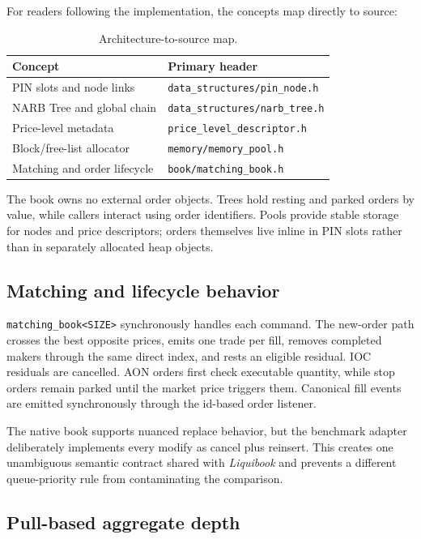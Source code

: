\documentclass[10pt,twocolumn]{article}
\begin{document}
For readers following the implementation, the concepts map directly to source:
\begin{table}[h]
\centering
\caption{Architecture-to-source map.}
\scriptsize
\begin{tabular}{@{}ll@{}}
\toprule
Concept & Primary header \\
\midrule
PIN slots and node links & \texttt{data\_structures/pin\_node.h} \\
NARB Tree and global chain & \texttt{data\_structures/narb\_tree.h} \\
Price-level metadata & \texttt{price\_level\_descriptor.h} \\
Block/free-list allocator & \texttt{memory/memory\_pool.h} \\
Matching and order lifecycle & \texttt{book/matching\_book.h} \\
\bottomrule
\end{tabular}
\end{table}

The book owns no external order objects.  Trees hold resting and parked orders
by value, while callers interact using order identifiers.  Pools provide stable
storage for nodes and price descriptors; orders themselves live inline in PIN
slots rather than in separately allocated heap objects.

\subsection{Matching and lifecycle behavior}

\texttt{matching\_book<SIZE>} synchronously handles each command.
The new-order path crosses the best opposite prices, emits one trade per fill,
removes completed makers through the same direct index, and rests an eligible
residual.  IOC residuals are cancelled.  AON orders first check executable
quantity, while stop orders remain parked until the market price triggers them.
Canonical fill events are emitted synchronously through the id-based order listener.

The native book supports nuanced replace behavior, but the benchmark adapter
deliberately implements every modify as cancel plus reinsert.  This creates one
unambiguous semantic contract shared with \textit{Liquibook} and prevents a different
queue-priority rule from contaminating the comparison.

\subsection{Pull-based aggregate depth}
\end{document}
